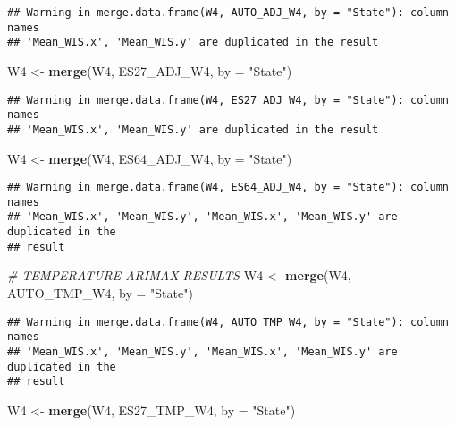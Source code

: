 \documentclass[
]{article}
\newenvironment{Shaded}{\begin{snugshade}}{\end{snugshade}}
\newcommand{\AttributeTok}[1]{\textcolor[rgb]{0.13,0.29,0.53}{#1}}
\newcommand{\CommentTok}[1]{\textcolor[rgb]{0.56,0.35,0.01}{\textit{#1}}}
\newcommand{\FunctionTok}[1]{\textcolor[rgb]{0.13,0.29,0.53}{\textbf{#1}}}
\newcommand{\NormalTok}[1]{#1}
\newcommand{\OtherTok}[1]{\textcolor[rgb]{0.56,0.35,0.01}{#1}}
\newcommand{\StringTok}[1]{\textcolor[rgb]{0.31,0.60,0.02}{#1}}
\begin{document}
\begin{verbatim}
## Warning in merge.data.frame(W4, AUTO_ADJ_W4, by = "State"): column names
## 'Mean_WIS.x', 'Mean_WIS.y' are duplicated in the result
\end{verbatim}

\begin{Shaded}
\begin{Highlighting}[]
\NormalTok{W4 }\OtherTok{\textless{}{-}} \FunctionTok{merge}\NormalTok{(W4, ES27\_ADJ\_W4, }\AttributeTok{by =} \StringTok{"State"}\NormalTok{)}
\end{Highlighting}
\end{Shaded}

\begin{verbatim}
## Warning in merge.data.frame(W4, ES27_ADJ_W4, by = "State"): column names
## 'Mean_WIS.x', 'Mean_WIS.y' are duplicated in the result
\end{verbatim}

\begin{Shaded}
\begin{Highlighting}[]
\NormalTok{W4 }\OtherTok{\textless{}{-}} \FunctionTok{merge}\NormalTok{(W4, ES64\_ADJ\_W4, }\AttributeTok{by =} \StringTok{"State"}\NormalTok{)}
\end{Highlighting}
\end{Shaded}

\begin{verbatim}
## Warning in merge.data.frame(W4, ES64_ADJ_W4, by = "State"): column names
## 'Mean_WIS.x', 'Mean_WIS.y', 'Mean_WIS.x', 'Mean_WIS.y' are duplicated in the
## result
\end{verbatim}

\begin{Shaded}
\begin{Highlighting}[]
\CommentTok{\# TEMPERATURE ARIMAX RESULTS}
\NormalTok{W4 }\OtherTok{\textless{}{-}} \FunctionTok{merge}\NormalTok{(W4, AUTO\_TMP\_W4, }\AttributeTok{by =} \StringTok{"State"}\NormalTok{)}
\end{Highlighting}
\end{Shaded}

\begin{verbatim}
## Warning in merge.data.frame(W4, AUTO_TMP_W4, by = "State"): column names
## 'Mean_WIS.x', 'Mean_WIS.y', 'Mean_WIS.x', 'Mean_WIS.y' are duplicated in the
## result
\end{verbatim}

\begin{Shaded}
\begin{Highlighting}[]
\NormalTok{W4 }\OtherTok{\textless{}{-}} \FunctionTok{merge}\NormalTok{(W4, ES27\_TMP\_W4, }\AttributeTok{by =} \StringTok{"State"}\NormalTok{)}
\end{Highlighting}
\end{Shaded}
\end{document}

